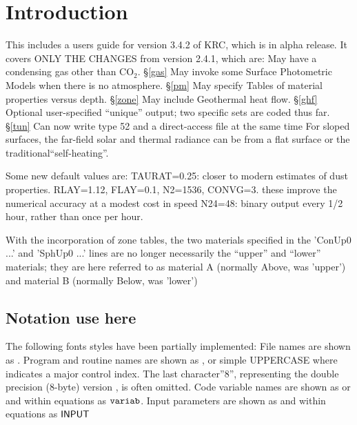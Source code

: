\documentclass{article}
\begin{document}
\section{Introduction \label{UG}}

This includes a users guide for version 3.4.2 of KRC, which is in alpha release. It covers ONLY THE CHANGES from version 2.4.1, which are:
\qi May have a condensing gas other than CO$_2$. \S \ref{gas} 
 \qi May invoke some Surface Photometric Models when there is no atmosphere. \S \ref{pm}
 \qi May specify Tables of material properties versus depth. \S \ref{zone}
 \qi May include Geothermal heat flow. \S \ref{ghf} 
\qi Optional user-specified ``unique'' output; two specific sets are coded thus far. \S \ref{tun}
\qi Can now write type 52 and a direct-access file at the same time
\qi For sloped surfaces, the far-field solar and thermal radiance can be from a flat surface or the traditional``self-heating''.

Some new default values are: 
\qi TAURAT=0.25: closer to modern estimates of dust properties.
\qi RLAY=1.12, FLAY=0.1, N2=1536, CONVG=3.
\qii these improve the numerical accuracy at a modest cost in speed
\qi N24=48: binary output every 1/2 hour, rather than once per hour.

With the incorporation of zone tables, the two materials specified in the
'ConUp0 ...' and 'SphUp0 ...' lines are no longer necessarily the ``upper'' and
``lower'' materials; they are here referred to as material A (normally Above,
was 'upper') and material B (normally Below, was 'lower')

\subsection{Notation use here}
The following fonts styles have been partially implemented: 
\qi File names are shown as . 
\qi Program and routine names are shown as  , or simple UPPERCASE
\qii where  indicates a major control index.
\qii The last character''8'', representing the double precision (8-byte) version , is often omitted. 
\qi Code variable names are shown as  or   and within equations as $\mathtt{variab}$.  
\qi Input parameters are shown as  and within equations as $\mathsf{INPUT}$
\end{document}
